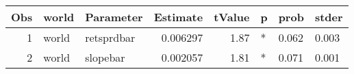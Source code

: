 

\begin{longtable}{|r|l|l|r|r|l|l|l|}\hline
   Obs &    world &    Parameter &    Estimate &    tValue &    p &    prob &    stder\\\hline
\endhead
   1 &    world &    retsprdbar &    0.006297 &    1.87 &    * &    0.062 &    0.003\\\hline
   2 &    world &    slopebar &    0.002057 &    1.81 &    * &    0.071 &    0.001\\\hline
\end{longtable}

